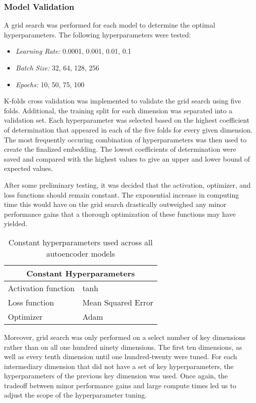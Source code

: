 \documentclass{article}
\begin{document}
\subsubsection{Model Validation}
\par A grid search was performed for each model to determine the optimal hyperparameters. The following hyperparameters were tested:
\begin{itemize}
    \item \textit{Learning Rate:} 0.0001, 0.001, 0.01, 0.1
    \item \textit{Batch Size:} 32, 64, 128, 256
    \item \textit{Epochs:} 10, 50, 75, 100
\end{itemize}
\par K-folds cross validation was implemented to validate the grid search using five folds. Additional, the training split for each dimension was separated into a validation set. Each hyperparameter was selected based on the highest coefficient of determination that appeared in each of the five folds for every given dimension. The most frequently occuring combination of hyperparameters was then used to create the finalized embedding. The lowest coefficients of determination were saved and compared with the highest values to give an upper and lower bound of expected values.
\par After some preliminary testing, it was decided that the activation, optimizer, and loss functions should remain constant. The exponential increase in computing time this would have on the grid search drastically outweighed any minor performance gains that a thorough optimization of these functions may have yielded.

\begin{table}[h!]
    \caption{Constant hyperparameters used across all autoencoder models}
    \label{tab:table1}
    \vspace{0.1cm}
    \begin{tabular}{p{4cm}p{7cm}}
        \hline
        \multicolumn{2}{c}{Constant Hyperparameters}\\
        \hline
        Activation function & tanh\\
        Loss function & Mean Squared Error  \\
        Optimizer & Adam \\
        \hline
    \end{tabular}
\end{table}
Moreover, grid search was only performed on a select number of key dimensions rather than on all one hundred ninety dimensions. The first ten dimensions, as well as every tenth dimension until one hundred-twenty were tuned. For each intermediary dimension that did not have a set of key hyperparameters, the hyperparameters of the previous key dimension was used. Once again, the tradeoff between minor performance gains and large compute times led us to adjust the scope of the  hyperparameter tuning.
\end{document}
